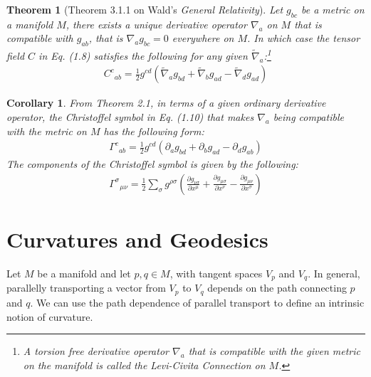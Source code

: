 \documentclass[11pt, onesided]{book}
\theoremstyle{break}
\theoremstyle{break}
\newtheorem{thm}{Theorem}[section]
\newtheorem{cor}{Corollary}[thm]
\newcommand{\pd}{\partial}
\newcommand{\that}[1]{\widetilde{#1}}
\newcommand{\txt}{Wald's \textit{General Relativity}}
\begin{document}
\begin{thm}[Theorem 3.1.1 on \txt]
Let $g_{bc}$ be a metric on a manifold $M$, there exists a unique derivative operator $\nabla_a$ on $M$ that is compatible with $g_{ab}$, that is $\nabla_a g_{bc} = 0$ everywhere on $M$. In which case the tensor field $C$ in Eq. (1.8) satisfies the following for any given $\that{\nabla}_a$:\footnote{A torsion free derivative operator $\nabla_a$ that is compatible with the given metric on the manifold is called the Levi-Civita Connection on $M$.}
\begin{align}
C^c{}_{ab} = \frac{1}{2}g^{cd}\left(\that{\nabla}_ag_{bd} + \that{\nabla}_b g_{ad} - \that{\nabla}_dg_{ad} \right)
\end{align}
\end{thm}
\newpage
\begin{cor}
From Theorem 2.1, in terms of a given ordinary derivative operator, the Christoffel symbol in Eq. (1.10) that makes $\nabla_a$ being compatible with the metric on $M$ has the following form:
\begin{align*}
\Gamma^c{}_{ab} = \frac{1}{2}g^{cd}\left( \pd_a g_{bd}+\pd_b g_{ad} - \pd_d g_{ab}\right)
\end{align*}
The components of the Christoffel symbol is given by the following:
\begin{align*}
\Gamma^\sigma{}_{\mu \nu} = \frac{1}{2}\sum_\sigma g^{\rho \sigma}\left( \frac{\pd g_{\nu \sigma}}{\pd x^\mu} + \frac{\pd g_{\mu \sigma}}{\pd x^\nu} - \frac{\pd g_{\mu\nu}}{\pd x^\sigma}\right)
\end{align*}
\end{cor}
\newpage

\section[Curvature and Geodesics of a Manifold]{\color{red}Curvatures and Geodesics\color{black}}
Let $M$ be a manifold and let $p,q \in M$, with tangent spaces $V_p$ and $V_q$. In general, parallelly transporting a vector from $V_p$ to $V_q$ depends on the path connecting $p$ and $q$. We can use the path dependence of parallel transport to define an intrinsic notion of curvature. \\
\end{document}
